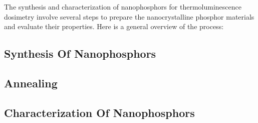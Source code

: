 \documentclass[../../Report.tex]{subfiles}
\begin{document}
    The synthesis and characterization of nanophosphors for thermoluminescence dosimetry involve several steps to 
    prepare the nanocrystalline phosphor materials and evaluate their properties. Here is a general overview of 
    the process:

    \subsection{\large Synthesis Of Nanophosphors}
        
        
    \newpage
    \subsection{\large Annealing}
        
    
    \newpage
    \subsection{\large Characterization Of Nanophosphors}
        
\end{document}
